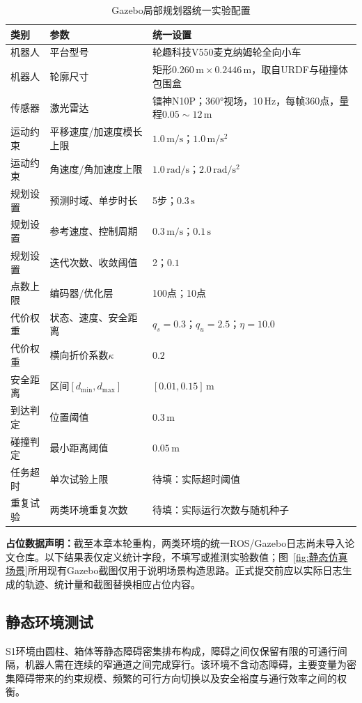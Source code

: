 \begin{table}[!htb]
	\centering
	\caption{Gazebo局部规划器统一实验配置}
	\label{tab:仿真统一参数}
	\begin{tabular}{p{}p{}p{}}
		\toprule
		类别 & 参数 & 统一设置 \\
		\midrule
		机器人 & 平台型号 & 轮趣科技V550麦克纳姆轮全向小车 \\
		机器人 & 轮廓尺寸 & 矩形$0.260\,\mathrm{m}\times0.2446\,\mathrm{m}$，取自URDF与碰撞体包围盒 \\
		传感器 & 激光雷达 & 镭神N10P；360°视场，10\,Hz，每帧360点，量程$0.05\sim12\,\mathrm{m}$ \\
		运动约束 & 平移速度/加速度模长上限 & $1.0\,\mathrm{m/s}$；$1.0\,\mathrm{m/s^2}$ \\
		运动约束 & 角速度/角加速度上限 & $1.0\,\mathrm{rad/s}$；$2.0\,\mathrm{rad/s^2}$ \\
		规划设置 & 预测时域、单步时长 & 5步；$0.3\,\mathrm{s}$ \\
		规划设置 & 参考速度、控制周期 & $0.3\,\mathrm{m/s}$；$0.1\,\mathrm{s}$ \\
		规划设置 & 迭代次数、收敛阈值 & 2；$0.1$ \\
		点数上限 & 编码器/优化层 & 100点；10点 \\
		代价权重 & 状态、速度、安全距离 & $q_s=0.3$；$q_u=2.5$；$\eta=10.0$ \\
		代价权重 & 横向折价系数$\kappa$ & $0.2$ \\
		安全距离 & 区间$\left[d_{\min},d_{\max}\right]$ & $\left[0.01,0.15\right]\,\mathrm{m}$ \\
		到达判定 & 位置阈值 & $0.3\,\mathrm{m}$ \\
		碰撞判定 & 最小距离阈值 & $0.05\,\mathrm{m}$ \\
		任务超时 & 单次试验上限 & 待填：实际超时阈值 \\
		重复试验 & 两类环境重复次数 & 待填：实际运行次数与随机种子 \\
		\bottomrule
	\end{tabular}
\end{table}

\noindent\textbf{占位数据声明：}截至本章本轮重构，两类环境的统一ROS/Gazebo日志尚未导入论文仓库。以下结果表仅定义统计字段，不填写或推测实验数值；图~\ref{fig:静态仿真场景}所用现有Gazebo截图仅用于说明场景构造思路。正式提交前应以实际日志生成的轨迹、统计量和截图替换相应占位内容。

\subsection{静态环境测试}
S1环境由圆柱、箱体等静态障碍密集排布构成，障碍之间仅保留有限的可通行间隔，机器人需在连续的窄通道之间完成穿行。该环境不含动态障碍，主要变量为密集障碍带来的约束规模、频繁的可行方向切换以及安全裕度与通行效率之间的权衡。

